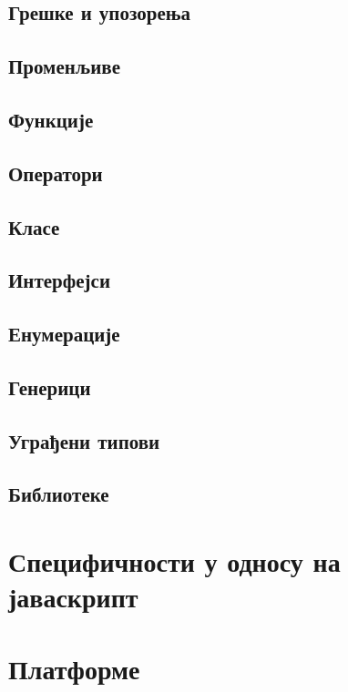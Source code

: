 \documentclass[12pt,oneside]{memoir}
\begin{document}
\subsection{Грешке и упозорења}

\subsection{Променљиве}

\subsection{Функције}

\subsection{Оператори}

\subsection{Класе}

\subsection{Интерфејси}

\subsection{Енумерације}

\subsection{Генерици}

\subsection{Уграђени типови}

\subsection{Библиотеке}

\section{Специфичности у односу на јаваскрипт}

\section{Платформе}
\end{document}
